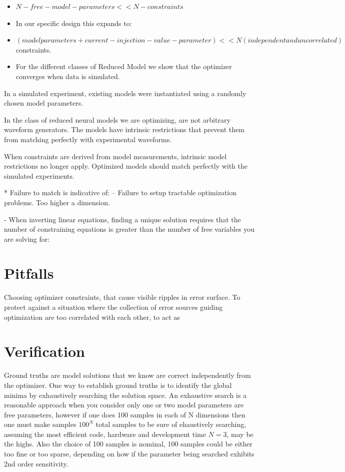 
\begin{itemize}
\item  $N-free-model-parameters << N-constraints$
\item  In our specific design this expands to:
\item  $(model parameters + current-injection-value-parameter) << N (independent and uncorrelated)$ constraints.
\item  For the different classes of Reduced Model we show that the optimizer converges when data is simulated.
\end{itemize}

In a simulated experiment, existing models were instantiated using a randomly chosen model parameters.

In the class of reduced neural models we are optimizing, are not arbitrary waveform generators. The models have intrinsic restrictions that prevent them from matching perfectly with experimental waveforms.

When constraints are derived from model measurements, intrinsic model restrictions no longer apply. Optimized models should match perfectly with the simulated experiments. 

* Failure to match is indicative of: -- Failure to setup tractable optimization problems. Too higher a dimension.

- When inverting linear equations, finding a unique solution requires that the number of constraining equations is greater than the number of free variables you are solving for:

\section{Pitfalls}
Choosing optimizer constraints, that cause visible ripples in error surface.
To protect against a situation where the collection of error sources guiding optimization are too correlated with each other, to act as 


\section{Verification}
Ground truths are model solutions that we know are correct independently from the optimizer. One way to establish ground truths is to identify the global minima by exhaustively searching the solution space. An exhaustive search is a reasonable approach when you consider only one or two model parameters are free parameters, however if one does 100 samples in each of N dimensions then one must make samples $100^{N}$ total samples to be sure of ehaustively searching, assuming the most efficient code, hardware and development time $N=3$, may be the highs.  Also the choice of 100 samples is nominal, 100 samples could be either too fine or too sparse, depending on how if the parameter being searched exhibits 2nd order sensitivity.

